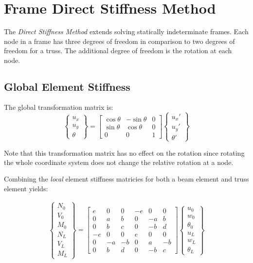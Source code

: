 \section{Frame Direct Stiffness Method}
The \textit{Direct Stiffness Method} extends solving statically indeterminate frames. Each node in a frame has three degrees of freedom in comparison to two degrees of freedom for a truss. The additional degree of freedom is the rotation at each node.

\subsection{Global Element Stiffness}

The global transformation matrix is:
\begin{equation}
	\begin{Bmatrix}
		u_x\\ u_y\\ \theta
	\end{Bmatrix}
	=
	\begin{bmatrix}
		\cos\theta & -\sin\theta & 0\\
		\sin\theta & \cos\theta & 0\\
		0 & 0 & 1
	\end{bmatrix}
	\begin{Bmatrix}
		u_x'\\ u_y'\\ \theta'
	\end{Bmatrix}
\end{equation}

Note that this transformation matrix has no effect on the rotation since rotating the whole coordinate system does not change the relative rotation at a node.

Combining the \textit{local} element stiffness matricies for both a beam element and truss element yields:

\begin{align}
	\begin{Bmatrix}
		N_0\\ V_0\\ M_0\\ \hline N_L\\ V_L\\ M_L
	\end{Bmatrix}
	=
	\left[
	\begin{array}{c|cc|c|cc}
		e & 0 & 0 & -e & 0 & 0\\ \hline
		0 & a & b & 0 & -a & b\\
		0 & b & c & 0 & -b & d\\ \hline
		-e & 0 & 0 & e & 0 & 0\\ \hline
		0 & -a & -b & 0 & a & -b\\
		0 & b & d & 0 & -b & c
	\end{array}
	\right]
	\begin{Bmatrix}
		u_0\\ w_0\\ \theta_0\\ \hline u_L\\ w_L\\ \theta_L
	\end{Bmatrix}
\end{align}

